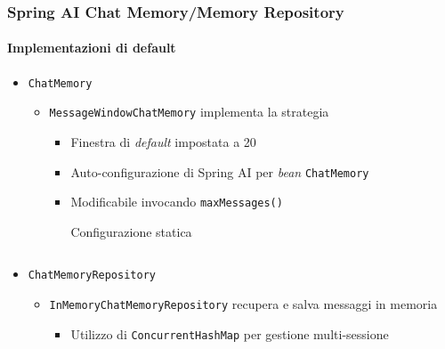 %
\begin{frame}[t,fragile] \frametitle{Spring AI Chat Memory/Memory Repository}
    \framesubtitle{Implementazioni di default}
    {\footnotesize
    \begin{itemize}[leftmargin=10pt,align=right]
        \item[\alert{\faArrowCircleRight}] \texttt{ChatMemory}
        \begin{itemize}[leftmargin=10pt,align=right]
            \item[\alert{\faArrowCircleRight}] \alert{\texttt{MessageWindowChatMemory}} implementa la strategia 
                \begin{itemize}[leftmargin=10pt,align=right]
                    \item[\alert{\faArrowCircleRight}] Finestra di \textit{default} impostata a 20
                    \item[\alert{\faArrowCircleRight}] Auto-configurazione di Spring AI per \textit{bean} \texttt{ChatMemory}
                    \item[\alert{\faArrowCircleRight}] Modificabile invocando \texttt{maxMessages()}
                    \begin{block}{Configurazione statica}
			            {\tiny\inputminted{java}{code/MessageWindowChatMemoryExample.java}}
    	            \end{block}
                \end{itemize}
        \end{itemize}
        \item[\alert{\faArrowCircleRight}] \texttt{ChatMemoryRepository}
        \begin{itemize}[leftmargin=10pt,align=right]
            \item[\alert{\faArrowCircleRight}] \alert{\texttt{InMemoryChatMemoryRepository}} recupera e salva messaggi in memoria
            \begin{itemize}[leftmargin=10pt,align=right]
                \item[\alert{\faArrowCircleRight}] Utilizzo di \texttt{ConcurrentHashMap} per gestione multi-sessione
            \end{itemize}
        \end{itemize}
    \end{itemize}
    }
\end{frame}
%
